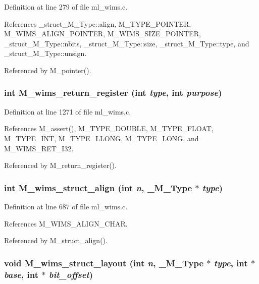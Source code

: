 Definition at line 279 of file ml\_\-wims.c.

References \_\-struct\_\-M\_\-Type::align, M\_\-TYPE\_\-POINTER, M\_\-WIMS\_\-ALIGN\_\-POINTER, M\_\-WIMS\_\-SIZE\_\-POINTER, \_\-struct\_\-M\_\-Type::nbits, \_\-struct\_\-M\_\-Type::size, \_\-struct\_\-M\_\-Type::type, and \_\-struct\_\-M\_\-Type::unsign.

Referenced by M\_\-pointer().
\subsubsection{\setlength{\rightskip}{0pt plus 5cm}int M\_\-wims\_\-return\_\-register (int {\em type}, int {\em purpose})}\label{ml__wims_8c_9c2e74ac65301e560a8faf09e05bbcd4}




Definition at line 1271 of file ml\_\-wims.c.

References M\_\-assert(), M\_\-TYPE\_\-DOUBLE, M\_\-TYPE\_\-FLOAT, M\_\-TYPE\_\-INT, M\_\-TYPE\_\-LLONG, M\_\-TYPE\_\-LONG, and M\_\-WIMS\_\-RET\_\-I32.

Referenced by M\_\-return\_\-register().
\subsubsection{\setlength{\rightskip}{0pt plus 5cm}int M\_\-wims\_\-struct\_\-align (int {\em n}, \bf{\_\-M\_\-Type} $\ast$ {\em type})}\label{ml__wims_8c_7d6387f52760c1d814b74b974c4e0932}




Definition at line 687 of file ml\_\-wims.c.

References M\_\-WIMS\_\-ALIGN\_\-CHAR.

Referenced by M\_\-struct\_\-align().
\subsubsection{\setlength{\rightskip}{0pt plus 5cm}void M\_\-wims\_\-struct\_\-layout (int {\em n}, \bf{\_\-M\_\-Type} $\ast$ {\em type}, int $\ast$ {\em base}, int $\ast$ {\em bit\_\-offset})}\label{ml__wims_8c_eb40c11e0e046cebe24f4b67a55d4336}




